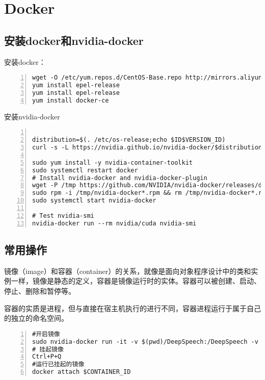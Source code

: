\chapter{Docker}
\section{安装docker和nvidia-docker}
安装docker：
\begin{lstlisting}[language = shell, numbers=left, 
		 numberstyle=\tiny,keywordstyle=\color{blue!70},
		 commentstyle=\color{red!50!green!50!blue!50},frame=shadowbox,
		 rulesepcolor=\color{red!20!green!20!blue!20},basicstyle=\ttfamily]
wget -O /etc/yum.repos.d/CentOS-Base.repo http://mirrors.aliyun.com/repo/Centos-7.repo  
yum install epel-release
yum install epel-release
yum install docker-ce
\end{lstlisting}

安装nvidia-docker
\begin{lstlisting}[language = shell, numbers=left, 
		 numberstyle=\tiny,keywordstyle=\color{blue!70},
		 commentstyle=\color{red!50!green!50!blue!50},frame=shadowbox,
		 rulesepcolor=\color{red!20!green!20!blue!20},basicstyle=\ttfamily]

distribution=$(. /etc/os-release;echo $ID$VERSION_ID)
curl -s -L https://nvidia.github.io/nvidia-docker/$distribution/nvidia-docker.repo | sudo tee /etc/yum.repos.d/nvidia-docker.repo

sudo yum install -y nvidia-container-toolkit
sudo systemctl restart docker
# Install nvidia-docker and nvidia-docker-plugin
wget -P /tmp https://github.com/NVIDIA/nvidia-docker/releases/download/v1.0.1/nvidia-docker-1.0.1-1.x86_64.rpm
sudo rpm -i /tmp/nvidia-docker*.rpm && rm /tmp/nvidia-docker*.rpm
sudo systemctl start nvidia-docker

# Test nvidia-smi
nvidia-docker run --rm nvidia/cuda nvidia-smi
\end{lstlisting}

\section{常用操作}
镜像（image）和容器（container）的关系，就像是面向对象程序设计中的类和实例一样，镜像是静态的定义，容器是镜像运行时的实体。容器可以被创建、启动、停止、删除和暂停等。

容器的实质是进程，但与直接在宿主机执行的进行不同，容器进程运行于属于自己的独立的命名空间。
\begin{lstlisting}[language = shell, numbers=left, 
		 numberstyle=\tiny,keywordstyle=\color{blue!70},
		 commentstyle=\color{red!50!green!50!blue!50},frame=shadowbox,
		 rulesepcolor=\color{red!20!green!20!blue!20},basicstyle=\ttfamily]
#开启镜像
sudo nvidia-docker run -it -v $(pwd)/DeepSpeech:/DeepSpeech -v /data1/asr_data:/mnt/data -v //data/kaldi/2019_0521_kaldi/kaldi-master:/mnt/kaldi paddlepaddle/deep_speech:latest-gpu /bin/bash
# 挂起镜像
Ctrl+P+Q
#运行已挂起的镜像
docker attach $CONTAINER_ID
\end{lstlisting}

